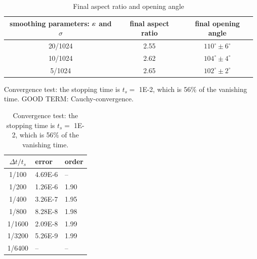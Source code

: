 \documentclass[preprint, 10pt]{elsarticle}
\begin{document}
\begin{table}%
\begin{center}
\caption{Final aspect ratio and opening angle
} 
\vspace{0.3 pc}
\label{table:arangle}
\begin{tabular}{c c c}
\hline
\hspace{0.5pc} smoothing parameters: $\varepsilon$ and $\sigma$
\hspace{0.5pc} & final aspect ratio 
\hspace{0.5pc} & final opening angle \\
\hline
20/1024		& 2.55	& $110^\circ \pm 6^\circ$	\\
10/1024		& 2.62	& $104^\circ \pm 4^\circ$	\\
5/1024		& 2.65	& $102^\circ \pm 2^\circ$	\\
\hline
\end{tabular}
\end{center}
\end{table}












\begin{table}%
\begin{center}
\caption{Convergence test: the stopping time is $t_s =$ 1E-2, which is
56\% of the vanishing time.  GOOD TERM: Cauchy-convergence.} 
\caption{Convergence test: the stopping time is $t_s =$ 1E-2, which is
56\% of the vanishing time.
} 
\vspace{0.3 pc}
\label{convtab}
\begin{tabular}{c l l}
\hline
\hspace{0.5pc} $\Delta t/t_s$
\hspace{0.5pc} & error 
\hspace{0.5pc} & order \\
\hline
1/100	& 4.69E-6		& --		\\
1/200	& 1.26E-6		& 1.90	\\
1/400	& 3.26E-7		& 1.95	\\
1/800	& 8.28E-8		& 1.98	\\
1/1600	& 2.09E-8		& 1.99	\\
1/3200	& 5.26E-9		& 1.99	\\
1/6400	& --			& --		\\
\hline
\end{tabular}
\end{center}
\end{table}
\end{document}
